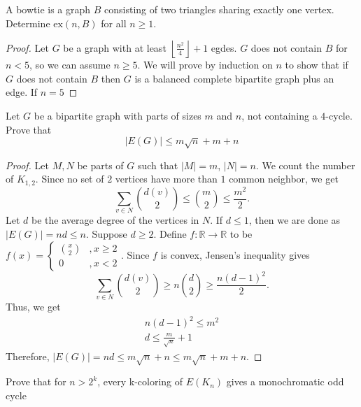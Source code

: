 \documentclass{article}
\newenvironment{problem}[2][Problem]{\begin{trivlist}
\item[\hskip \labelsep {\bfseries #1}\hskip \labelsep {\bfseries #2.}]}{\end{trivlist}}
\begin{document}
\begin{problem}{5.9.10}
    A bowtie is a graph $B$ consisting of two triangles sharing exactly one vertex. Determine $\text{ex}(n, B)$ for all $n \geq 1$.
\end{problem}
\begin{proof}
    Let $G$ be a graph with at least $\left\lfloor\frac{n^2}{4}\right\rfloor + 1$ egdes. $G$ does not contain $B$ for $n < 5$, so we can assume $n \geq 5$. We will prove by induction on $n$ to show that if $G$ does not contain $B$ then $G$ is a balanced complete bipartite graph plus an edge. If $n = 5$
\end{proof}

\begin{problem}{5.9.12}
    Let $G$ be a bipartite graph with parts of sizes $m$ and $n$, not containing a $4$-cycle. Prove that
    \[
        |E(G)| \leq m\sqrt{n} + m + n
    \]
\end{problem}

\begin{proof}
    Let $M, N$ be parts of $G$ such that $|M| = m$, $|N| = n$. We count the number of $K_{1,2}$. Since no set of $2$ vertices have more than $1$ common neighbor, we get
    \[
        \sum_{v \in N} { d(v) \choose 2 } \leq { m \choose 2 } \leq \frac{m^2}{2}.
    \]
    Let $d$ be the average degree of the vertices in $N$. If $d \leq 1$, then we are done as $|E(G)| = nd \leq n$. Suppose $d \geq 2$. Define $f : \mathbb{R} \rightarrow \mathbb{R}$ to be $f(x) = \begin{cases}
        { x \choose 2 } &, x \geq 2 \\
        0 &, x < 2
    \end{cases}$. Since $f$ is convex, Jensen's inequality gives 
    \[
        \sum_{v \in N} { d(v) \choose 2 } \geq n{ d \choose 2 } \geq \frac{n(d - 1)^2}{2}.
    \]
    Thus, we get 
    \begin{gather}
        n(d - 1)^2 \leq m^2 \\
        d \leq \frac{m}{\sqrt{n}} + 1
    \end{gather}
    Therefore, $|E(G)| = nd \leq m\sqrt{n} + n \leq m\sqrt{n} + m + n$.
\end{proof}

\begin{problem}{6.3.9}
    Prove that for $n > 2^k$, every k-coloring of $E(K_n)$ gives a monochromatic odd cycle
\end{problem}
\end{document}
